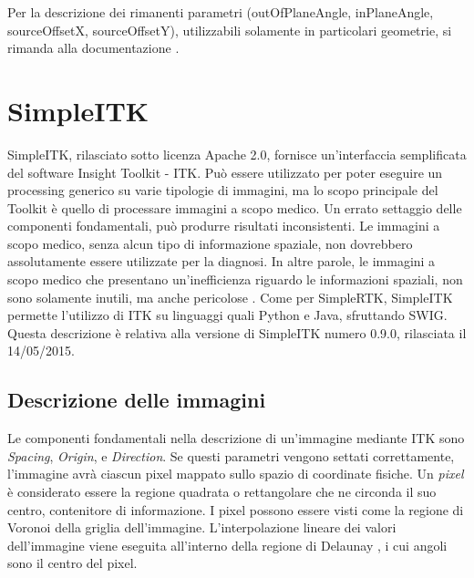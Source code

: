 \documentclass[a4paper,12pt, doubleside]{report}
\begin{document}
                    Per la descrizione dei rimanenti parametri (outOfPlaneAngle, inPlaneAngle, sourceOffsetX, sourceOffsetY), utilizzabili solamente in particolari geometrie, si rimanda alla documentazione \cite{rtk-geometry}.
                
        \section{SimpleITK}
            \par
                SimpleITK, rilasciato sotto licenza Apache 2.0, fornisce un'interfaccia semplificata del software Insight Toolkit - ITK. Può essere utilizzato per poter eseguire un processing generico su varie tipologie di immagini, ma lo scopo principale del Toolkit è quello di processare immagini a scopo medico. Un errato settaggio delle componenti fondamentali, può produrre risultati inconsistenti. Le immagini a scopo medico, senza alcun tipo di informazione spaziale, non dovrebbero assolutamente essere utilizzate per la diagnosi. In altre parole, le immagini a scopo medico che presentano un'inefficienza riguardo le informazioni spaziali, non sono solamente inutili, ma anche pericolose \cite{itk-doc}. Come per SimpleRTK, SimpleITK permette l'utilizzo di ITK su linguaggi quali Python e Java, sfruttando SWIG. Questa descrizione è relativa alla versione di SimpleITK numero 0.9.0, rilasciata il 14/05/2015.
                
            \subsection{Descrizione delle immagini}
                Le componenti fondamentali nella descrizione di un'immagine mediante ITK sono \textit{Spacing}, \textit{Origin}, e \textit{Direction}. Se questi parametri vengono settati correttamente, l'immagine avrà ciascun pixel mappato sullo spazio di coordinate fisiche. Un \textit{pixel} è considerato essere la regione quadrata o rettangolare che ne circonda il suo centro, contenitore di informazione. I pixel possono essere visti come la regione di Voronoi \cite{voronoi} della griglia dell’immagine. L’interpolazione lineare dei valori dell’immagine viene eseguita all’interno della regione di Delaunay \cite{delaunay}, i cui angoli sono il centro del pixel. 
                
\end{document}
